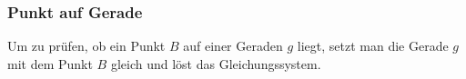 \subsubsection{Punkt auf Gerade}
Um zu prüfen, ob ein Punkt $B$ auf einer Geraden $g$ liegt, setzt man
die Gerade $g$ mit dem Punkt $B$ gleich und löst das Gleichungssystem.

